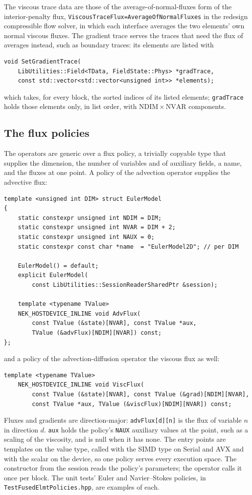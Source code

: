 The viscous trace data are those of the average-of-normal-fluxes form of the
interior-penalty flux, \texttt{ViscousTraceFlux=AverageOfNormalFluxes} in
the redesign compressible flow solver, in which each interface averages the
two elements' own normal viscous fluxes. The gradient trace serves the
traces that need the flux of averages instead, such as boundary traces: its
elements are listed with
\begin{lstlisting}[style=C++Style]
void SetGradientTrace(
    LibUtilities::Field<TData, FieldState::Phys> *gradTrace,
    const std::vector<std::vector<unsigned int>> *elements);
\end{lstlisting}
which takes, for every block, the sorted indices of its listed elements;
\texttt{gradTrace} holds those elements only, in list order, with
$\mathrm{NDIM} \times \mathrm{NVAR}$ components.

\subsection{The flux policies}

The operators are generic over a flux policy, a trivially copyable type
that supplies the dimension, the number of variables and of auxiliary
fields, a name, and the fluxes at one point. A policy of the advection
operator supplies the advective flux:
\begin{lstlisting}[style=C++Style]
template <unsigned int DIM> struct EulerModel
{
    static constexpr unsigned int NDIM = DIM;
    static constexpr unsigned int NVAR = DIM + 2;
    static constexpr unsigned int NAUX = 0;
    static constexpr const char *name  = "EulerModel2D"; // per DIM

    EulerModel() = default;
    explicit EulerModel(
        const LibUtilities::SessionReaderSharedPtr &session);

    template <typename TValue>
    NEK_HOSTDEVICE_INLINE void AdvFlux(
        const TValue (&state)[NVAR], const TValue *aux,
        TValue (&advFlux)[NDIM][NVAR]) const;
};
\end{lstlisting}
and a policy of the advection-diffusion operator the viscous flux as well:
\begin{lstlisting}[style=C++Style]
    template <typename TValue>
    NEK_HOSTDEVICE_INLINE void ViscFlux(
        const TValue (&state)[NVAR], const TValue (&grad)[NDIM][NVAR],
        const TValue *aux, TValue (&viscFlux)[NDIM][NVAR]) const;
\end{lstlisting}
Fluxes and gradients are direction-major: \texttt{advFlux[d][n]} is the
flux of variable $n$ in direction $d$. \texttt{aux} holds the policy's
\texttt{NAUX} auxiliary values at the point, such as a scaling of the
viscosity, and is null when it has none. The entry points are templates on
the value type, called with the SIMD type on Serial and AVX and with the
scalar on the device, so one policy serves every execution space. The
constructor from the session reads the policy's parameters; the operator
calls it once per block. The unit tests' Euler and Navier--Stokes policies,
in \texttt{TestFusedElmtPolicies.hpp}, are examples of each.

